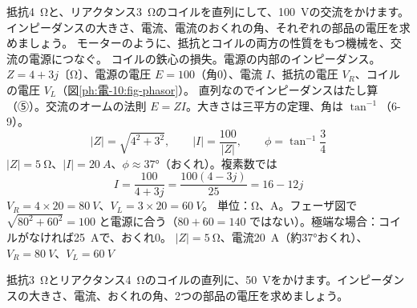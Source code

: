 \begin{phreidai}[抵抗とコイルの直列]
\label{ph:電-10:ex5}抵抗\qty{4}{\ohm}と、リアクタンス\qty{3}{\ohm}のコイルを直列にして、\qty{100}{V}の交流をかけます。インピーダンスの大きさ、電流、電流のおくれの角、それぞれの部品の電圧を求めましょう。
\phbamen
モーターのように、抵抗とコイルの両方の性質をもつ機械を、交流の電源につなぐ。
\phmushi
コイルの鉄心の損失。電源の内部のインピーダンス。
\phzu
$Z=4+3j$〔Ω〕、電源の電圧 $E=100$（角0）、電流 $I$、抵抗の電圧 $V_R$、コイルの電圧 $V_L$（図\ref{ph:電-10:fig-phasor}）。
\phriyu
直列なのでインピーダンスはたし算（⑤）。交流のオームの法則 $E=ZI$。大きさは三平方の定理、角は $\tan^{-1}$（6-9）。
\phtateru
\[ \lvert Z\rvert=\sqrt{4^2+3^2},\qquad \lvert I\rvert=\frac{100}{\lvert Z\rvert},\qquad \phi=\tan^{-1}\frac{3}{4} \]
\phtoku
$\lvert Z\rvert=\qty{5}{\ohm}$、$\lvert I\rvert=\qty{20}{A}$、$\phi\approx37°$（おくれ）。複素数では
\[ I=\frac{100}{4+3j}=\frac{100(4-3j)}{25}=16-12j \]
$V_R=4\times20=\qty{80}{V}$、$V_L=3\times20=\qty{60}{V}$。
\phtashikame
単位：Ω、A。フェーザ図で $\sqrt{80^2+60^2}=100$ と電源に合う（$80+60=140$ ではない）。極端な場合：コイルがなければ\qty{25}{A}で、おくれ0。
\kotae $\lvert Z\rvert=\qty{5}{\ohm}$、電流\qty{20}{A}（約37°おくれ）、$V_R=\qty{80}{V}$、$V_L=\qty{60}{V}$
\end{phreidai}
\begin{jibun}
抵抗\qty{3}{\ohm}とリアクタンス\qty{4}{\ohm}のコイルの直列に、\qty{50}{V}をかけます。インピーダンスの大きさ、電流、おくれの角、2つの部品の電圧を求めましょう。
\end{jibun}

